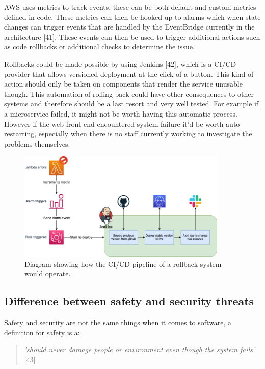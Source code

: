   AWS uses metrics to track events, these can be both default and custom metrics defined in code. These metrics can then be hooked up to alarms which 
  when state changes can trigger events that are handled by the EventBridge currently in the architecture [41]. These events can then be used to trigger
  additional actions such as code rollbacks or additional checks to determine the issue.

  Rollbacks could be made possible by using Jenkins [42], which is a CI/CD provider that allows versioned deployment at the click of a button. This kind 
  of action should only be taken on components that render the service unusable though. This automation of rolling back could have other consequences to 
  other systems and therefore should be a last resort and very well tested. For example if a microservice failed, it might not be worth having this automatic
  process. However if the web front end encountered system failure it'd be worth auto restarting, especially when there is no staff currently working to 
  investigate the problems themselves.
  
  \begin{figure}[H]
    \centering
    \includegraphics[width=10cm]{assets/rollbackPipeline.drawio.png}
    \caption{Diagram showing how the CI/CD pipeline of a rollback system would operate.}
    \label{fig:rollbackPipeline}
  \end{figure}
  
  \subsection{Difference between safety and security threats}

  Safety and security are not the same things when it comes to software, a definition for safety is a:
  \begin{quote}
    \textit{'should never damage people or environment even though the system fails'} [43]
  \end{quote}

